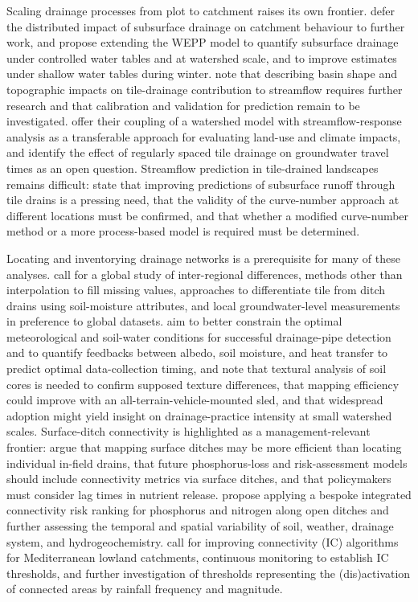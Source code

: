 Scaling drainage processes from plot to catchment raises its own frontier.
\textcite{Muma2016} defer the distributed impact of subsurface drainage on
catchment behaviour to further work, and \textcite{RevueltaAcosta2021} propose
extending the WEPP model to quantify subsurface drainage under controlled water
tables and at watershed scale, and to improve estimates under shallow water
tables during winter. \textcite{Thomas2016} note that describing basin shape
and topographic impacts on tile-drainage contribution to streamflow requires
further research and that calibration and validation for prediction remain to
be investigated. \textcite{Rahman2014} offer their coupling of a watershed
model with streamflow-response analysis as a transferable approach for
evaluating land-use and climate impacts, and \textcite{Schilling2015} identify
the effect of regularly spaced tile drainage on groundwater travel times as an
open question. Streamflow prediction in tile-drained landscapes remains
difficult: \textcite{Wessel2022} state that improving predictions of
subsurface runoff through tile drains is a pressing need, that the validity of
the curve-number approach at different locations must be confirmed, and that
whether a modified curve-number method or a more process-based model is
required must be determined.

Locating and inventorying drainage networks is a prerequisite for many of
these analyses. \textcite{Yimer2023} call for a global study of inter-regional
differences, methods other than interpolation to fill missing values,
approaches to differentiate tile from ditch drains using soil-moisture
attributes, and local groundwater-level measurements in preference to global
datasets. \textcite{Kratt2020} aim to better constrain the optimal
meteorological and soil-water conditions for successful drainage-pipe
detection and to quantify feedbacks between albedo, soil moisture, and heat
transfer to predict optimal data-collection timing, and
\textcite{Allred2018b} note that textural analysis of soil cores is needed to
confirm supposed texture differences, that mapping efficiency could improve
with an all-terrain-vehicle-mounted sled, and that widespread adoption might
yield insight on drainage-practice intensity at small watershed scales.
Surface-ditch connectivity is highlighted as a management-relevant frontier:
\textcite{Moloney2020} argue that mapping surface ditches may be more efficient
than locating individual in-field drains, that future phosphorus-loss and
risk-assessment models should include connectivity metrics via surface ditches,
and that policymakers must consider lag times in nutrient release.
\textcite{Opoku2024} propose applying a bespoke integrated connectivity risk
ranking for phosphorus and nitrogen along open ditches and further assessing
the temporal and spatial variability of soil, weather, drainage system, and
hydrogeochemistry. \textcite{Calsamiglia2018} call for improving connectivity
(IC) algorithms for Mediterranean lowland catchments, continuous monitoring to
establish IC thresholds, and further investigation of thresholds representing
the (dis)activation of connected areas by rainfall frequency and magnitude.

